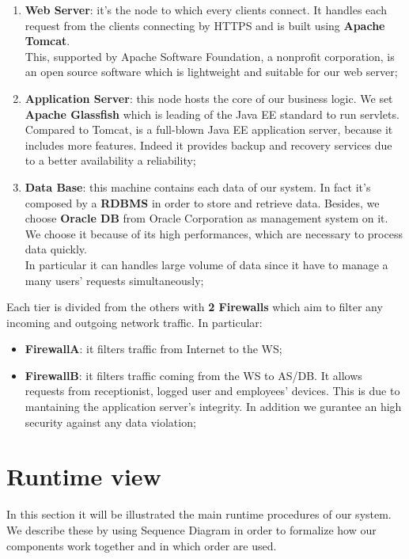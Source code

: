 \begin{enumerate}
\item \textbf{Web Server}: it's the node to which every clients connect. It handles each request from the clients connecting by HTTPS and is built using \textbf{Apache Tomcat}. \\
This, supported by Apache Software Foundation, a nonprofit corporation, is an open source software which is lightweight and suitable for our web server;
\item \textbf{Application Server}: this node hosts the core of our business logic. We set \textbf{Apache Glassfish} which is leading of the Java EE standard to run servlets. Compared to Tomcat, is a full-blown Java EE application server, because it includes more features. Indeed it provides backup and recovery services due to a better availability a reliability;

\item \textbf{Data Base}: this machine contains each data of our system. In fact it's composed by a \textbf{RDBMS} in order to store and retrieve data. Besides, we choose \textbf{Oracle DB} from Oracle Corporation as management system on it. We choose it because of its high performances, which are necessary to process data quickly. \\
In particular it can handles large volume of data since it have to manage a many users' requests simultaneously;
\end{enumerate}
\bigskip
Each tier is divided from the others with \textbf{2 Firewalls} which aim to filter any incoming and outgoing network traffic.
In particular:

\begin{itemize}

\item \textbf{FirewallA}: it filters traffic from Internet to the WS;

\item \textbf{FirewallB}: it filters traffic coming from the WS to AS/DB. It allows requests from receptionist, logged user and employees' devices. This is due to mantaining the application server's integrity. In addition we gurantee an high security against any data violation;

\end{itemize}

\bigskip
\bigskip
\bigskip
\bigskip

\section{Runtime view}
In this section it will be illustrated the main runtime procedures of our system. We describe these by using Sequence Diagram in order to formalize how our components work together and in which order are used.


